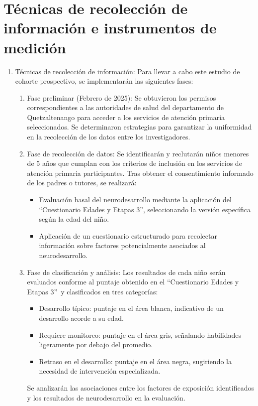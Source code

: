 \documentclass[11pt,letterpaper]{report}
\newcommand{\asq}{“Cuestionario Edades y Etapas 3”}
\begin{document}
\section{Técnicas de recolección de información e instrumentos de medición}
\begin{enumerate}
	\item Técnicas de recolección de información:
	Para llevar a cabo este estudio de cohorte prospectivo, se implementarán
	las siguientes fases:
	\begin{enumerate}
		\item Fase preliminar (Febrero de 2025):
		Se obtuvieron los permisos correspondientes a las autoridades de salud
		del departamento de Quetzaltenango para acceder a los servicios de
		atención primaria seleccionados. Se determinaron estrategias para
		garantizar la uniformidad en la recolección de los datos entre los
		investigadores.
		\item Fase de recolección de datos:
		Se identificarán y reclutarán niños menores de 5 años que cumplan con
		los criterios de inclusión en los servicios de atención primaria
		participantes. Tras obtener el consentimiento informado de los padres o
		tutores, se realizará:
			\begin{itemize}
			\item Evaluación basal del neurodesarrollo mediante la aplicación
			del \asq, seleccionando la versión específica según la edad del
			niño.
			\item Aplicación de un cuestionario estructurado para recolectar
			información sobre factores potencialmente asociados al
			neurodesarrollo.
			\end{itemize}
		\item Fase de clasificación y análisis:
		Los resultados de cada niño serán evaluados conforme al
		puntaje obtenido en el \asq\
		y clasificados en tres categorías:
			\begin{itemize}
			\item Desarrollo típico: puntaje en el área blanca, indicativo de
			un desarrollo acorde a su edad.
			\item Requiere monitoreo: puntaje en el área gris, señalando
			habilidades ligeramente por debajo del promedio.
			\item Retraso en el desarrollo: puntaje en el área negra,
			sugiriendo la necesidad de intervención especializada.
			\end{itemize}
		Se analizarán las asociaciones entre los factores de exposición
		identificados y los resultados de neurodesarrollo en la evaluación.

\end{enumerate}
\end{enumerate}
\end{document}
